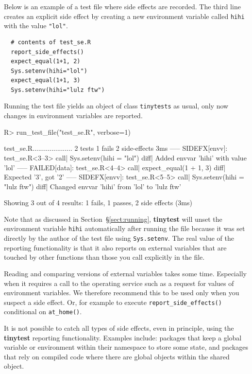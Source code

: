 \documentclass[11pt]{article}
\newcommand{\code}[1]{\texttt{#1}}
\newcommand{\pkg}[1]{\textbf{#1}}
\begin{document}
Below is an example of a test file where side effects are recorded. The third
line creates an explicit side effect by creating a new environment variable
called \code{hihi} with the value \code{"lol"}.
\begin{verbatim}
  # contents of test_se.R
  report_side_effects()
  expect_equal(1+1, 2)
  Sys.setenv(hihi="lol")
  expect_equal(1+1, 3)
  Sys.setenv(hihi="lulz ftw")
\end{verbatim}
Running the test file yields an object of class \code{tinytests} as usual, only
now changes in environment variables are reported.
\begin{Schunk}
\begin{Sinput}
R>  run_test_file("test_se.R", verbose=1)
\end{Sinput}
\begin{Soutput}
test_se.R.....................    2 tests 1 fails 2 side-effects  3ms
----- SIDEFX[envv]: test_se.R<3--3>
 call| Sys.setenv(hihi = "lol")
 diff| Added envvar 'hihi' with value 'lol'
 ----- FAILED[data]: test_se.R<4--4>
 call| expect_equal(1 + 1, 3)
 diff| Expected '3', got '2'
 ----- SIDEFX[envv]: test_se.R<5--5>
 call| Sys.setenv(hihi = "lulz ftw")
 diff| Changed envvar 'hihi' from 'lol' to 'lulz ftw'
 
Showing 3 out of 4 results: 1 fails, 1 passes, 2 side effects (3ms)
\end{Soutput}
\end{Schunk}
Note that as discussed in Section~\S\ref{sect:running}, \pkg{tinytest} will
unset the environment variable \code{hihi} automatically after running the file
because it was set directly by the author of the test file using
\code{Sys.setenv}. The real value of the reporting functionality is that it
also reports on external variables that are touched by other functions than
those you call explicitly in the file.

Reading and comparing versions of external variables takes some time.
Especially when it requires a call to the operating service such as a request
for values of environment variables. We therefore recommend this to be used
only when you suspect a side effect. Or, for example to execute
\code{report\_side\_effects()} conditional on \code{at\_home()}.

It is not possible to catch all types of side effects, even in principle, using
the \pkg{tinytest} reporting functionality. Examples include: packages that
keep a global variable or environment within their namespace to store some
state, and packages that rely on compiled code where there are global objects
within the shared object.
\end{document}
